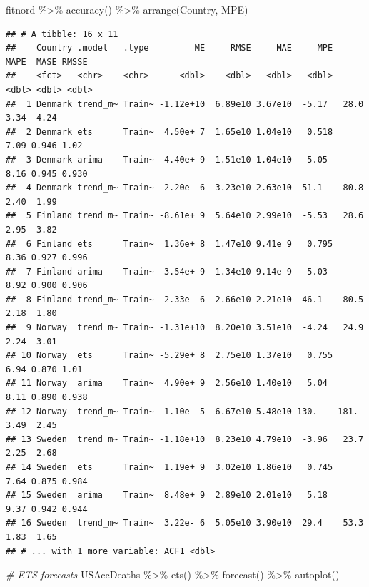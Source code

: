 \documentclass[
]{book}
\newenvironment{Shaded}{\begin{snugshade}}{\end{snugshade}}
\newcommand{\CommentTok}[1]{\textcolor[rgb]{0.56,0.35,0.01}{\textit{#1}}}
\newcommand{\FunctionTok}[1]{\textcolor[rgb]{0.00,0.00,0.00}{#1}}
\newcommand{\NormalTok}[1]{#1}
\newcommand{\SpecialCharTok}[1]{\textcolor[rgb]{0.00,0.00,0.00}{#1}}
\begin{document}
\begin{Shaded}
\begin{Highlighting}[]
\NormalTok{fitnord }\SpecialCharTok{\%\textgreater{}\%}
  \FunctionTok{accuracy}\NormalTok{() }\SpecialCharTok{\%\textgreater{}\%}
  \FunctionTok{arrange}\NormalTok{(Country, MPE)}
\end{Highlighting}
\end{Shaded}

\begin{verbatim}
## # A tibble: 16 x 11
##    Country .model   .type         ME     RMSE     MAE     MPE   MAPE  MASE RMSSE
##    <fct>   <chr>    <chr>      <dbl>    <dbl>   <dbl>   <dbl>  <dbl> <dbl> <dbl>
##  1 Denmark trend_m~ Train~ -1.12e+10  6.89e10 3.67e10  -5.17   28.0  3.34  4.24 
##  2 Denmark ets      Train~  4.50e+ 7  1.65e10 1.04e10   0.518   7.09 0.946 1.02 
##  3 Denmark arima    Train~  4.40e+ 9  1.51e10 1.04e10   5.05    8.16 0.945 0.930
##  4 Denmark trend_m~ Train~ -2.20e- 6  3.23e10 2.63e10  51.1    80.8  2.40  1.99 
##  5 Finland trend_m~ Train~ -8.61e+ 9  5.64e10 2.99e10  -5.53   28.6  2.95  3.82 
##  6 Finland ets      Train~  1.36e+ 8  1.47e10 9.41e 9   0.795   8.36 0.927 0.996
##  7 Finland arima    Train~  3.54e+ 9  1.34e10 9.14e 9   5.03    8.92 0.900 0.906
##  8 Finland trend_m~ Train~  2.33e- 6  2.66e10 2.21e10  46.1    80.5  2.18  1.80 
##  9 Norway  trend_m~ Train~ -1.31e+10  8.20e10 3.51e10  -4.24   24.9  2.24  3.01 
## 10 Norway  ets      Train~ -5.29e+ 8  2.75e10 1.37e10   0.755   6.94 0.870 1.01 
## 11 Norway  arima    Train~  4.90e+ 9  2.56e10 1.40e10   5.04    8.11 0.890 0.938
## 12 Norway  trend_m~ Train~ -1.10e- 5  6.67e10 5.48e10 130.    181.   3.49  2.45 
## 13 Sweden  trend_m~ Train~ -1.18e+10  8.23e10 4.79e10  -3.96   23.7  2.25  2.68 
## 14 Sweden  ets      Train~  1.19e+ 9  3.02e10 1.86e10   0.745   7.64 0.875 0.984
## 15 Sweden  arima    Train~  8.48e+ 9  2.89e10 2.01e10   5.18    9.37 0.942 0.944
## 16 Sweden  trend_m~ Train~  3.22e- 6  5.05e10 3.90e10  29.4    53.3  1.83  1.65 
## # ... with 1 more variable: ACF1 <dbl>
\end{verbatim}

\begin{Shaded}
\begin{Highlighting}[]
\CommentTok{\# ETS forecasts}
\NormalTok{USAccDeaths }\SpecialCharTok{\%\textgreater{}\%}
  \FunctionTok{ets}\NormalTok{() }\SpecialCharTok{\%\textgreater{}\%}
  \FunctionTok{forecast}\NormalTok{() }\SpecialCharTok{\%\textgreater{}\%}
  \FunctionTok{autoplot}\NormalTok{()}
\end{Highlighting}
\end{Shaded}
\end{document}
